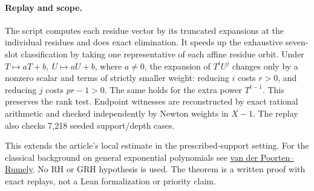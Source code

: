 \documentclass[11pt]{article}
\begin{document}
\paragraph{Replay and scope.}
The script computes each residue vector by its truncated
expansions at the individual residues and does exact elimination.
It speeds up the exhaustive seven-slot classification by taking
one representative of each affine residue orbit. Under
\(T\mapsto aT+b,\ U\mapsto aU+b\), where \(a\ne0\), the
expansion of \(T^iU^j\) changes only by a nonzero scalar and
terms of strictly smaller weight: reducing \(i\) costs \(r>0\),
and reducing \(j\) costs \(pr-1>0\). The same holds for the
extra power \(T^{t-1}\). This preserves the rank test.
Endpoint witnesses are reconstructed by exact rational
arithmetic and checked independently by Newton weights in \(X-1\).
The replay also checks 7,218 seeded support/depth cases.

This extends the article's local estimate in the
prescribed-support setting. For the classical background on
general exponential polynomials see
\href{https://doi.org/10.1112/jlms/s2-36.1.1}{van der Poorten--Rumely}.
No RH or GRH hypothesis is used. The theorem is a written proof
with exact replays, not a Lean formalization or priority claim.
\end{document}
